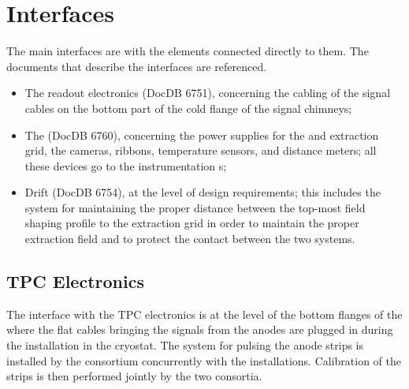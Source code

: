 

\section{Interfaces}
\label{sec:fddp-crp-intfc}

The main  interfaces  are with the elements connected directly to them. The documents that describe the interfaces are referenced.
\begin{itemize}
\item The readout electronics  (DocDB 6751), concerning the cabling of the signal cables on the bottom part of the cold 
flange of the signal chimneys; 
\item The  (DocDB 6760),  concerning the power supplies for the  and extraction grid, the cameras,  ribbons, temperature sensors, and distance meters; all these devices go to the  instrumentation \fdth{}s; 

\item Drift  (DocDB 6754), at the level of design requirements; this includes the system for maintaining the proper distance between the top-most field shaping profile to the extraction grid in order to maintain the proper extraction field and to protect the contact between the two systems.
\end{itemize}

\subsection{TPC Electronics}
\label{sec:fddp-crp-intfc-elec}

The interface with the \dual TPC electronics is at the level of the bottom flanges of the  where the flat cables bringing the signals from the anodes are plugged in during the  installation in the cryostat. The system for %
pulsing the anode strips is installed by the  consortium %
concurrently with the  installations. %
Calibration of the strips is then performed jointly by the two consortia.

